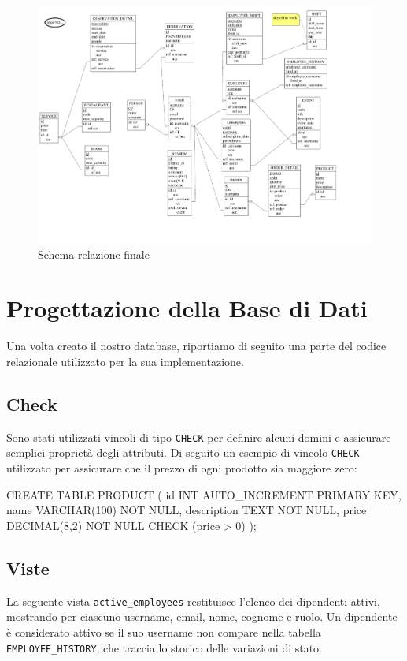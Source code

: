 \documentclass[a4paper,12pt]{report}
\begin{document}
\begin{figure}[H]
  \centering
  \includegraphics[width=\textwidth, trim=0 0 0 0]{./schemas/logic.pdf}
  \caption{Schema relazione finale}
  \label{fig:schema-relazione}
\end{figure}
\newpage


\chapter{Progettazione della Base di Dati}
Una volta creato il nostro database, riportiamo di seguito una parte
del codice relazionale
utilizzato per la sua implementazione.

\section{Check}
Sono stati utilizzati vincoli di tipo \texttt{CHECK} per definire
alcuni domini e assicurare
semplici proprietà degli attributi. Di seguito un esempio di vincolo
\texttt{CHECK} utilizzato
per assicurare che il prezzo di ogni prodotto sia maggiore zero:

\begin{sqlcode}[caption={},label={lst:check}]
CREATE TABLE PRODUCT (
    id INT AUTO_INCREMENT PRIMARY KEY,
    name VARCHAR(100) NOT NULL,
    description TEXT NOT NULL,
    price DECIMAL(8,2) NOT NULL CHECK (price > 0)
);
\end{sqlcode}

\section{Viste}
La seguente vista \texttt{active\_employees} restituisce l'elenco dei
dipendenti attivi,
mostrando per ciascuno username, email, nome, cognome e ruolo. Un
dipendente è considerato
attivo se il suo username non compare nella tabella
\texttt{EMPLOYEE\_HISTORY}, che traccia
lo storico delle variazioni di stato.
\end{document}
